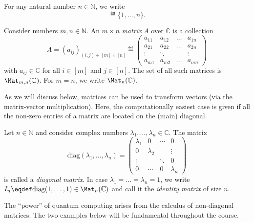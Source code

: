 \documentclass[a4paper,oneside, 12pt]{amsart}
\begin{document}
For any natural number  \(n \in \mathbb{N}\), we write
\begin{equation}
  [n] \eqdef \{1, \dots , n\}.
\end{equation}
\begin{definition}\label{def:matrices}
  Consider numbers \(m, n \in \mathbb{N}\).
  An \( m \times n \) \emph{matrix} \(A\) over \( \mathbb{C} \) is a collection
  \begin{equation}
    A= (a_{ij})_{(i, j) \in [m] \times [n]} \eqdef
    \begin{pmatrix}
      a_{11} & a_{12} & \dots & a_{1n} \\
      a_{21} & a_{22} & \dots & a_{2n} \\
      \vdots& \ddots & & \vdots\\
      a_{m1} & a_{m2} & \dots & a_{mn}
    \end{pmatrix}
  \end{equation}
  with \(a_{ij} \in \mathbb{C}\) for all \(i \in [m]\) and \(j \in [n]\).
  The set of all such matrices is \( \Mat_{m,n}(\mathbb{C}) \).
  For \( m = n \), we write \( \Mat_n(\mathbb{C}) \).
\end{definition}

As we will discuss below, matrices can be used to transform vectors (via the matrix-vector multiplication).
Here, the computationally easiest case is given if all the non-zero entries of a matrix are located on the (main) diagonal.
\begin{example}\label{ex:diagonal-matrices}
  Let \(n\in \mathbb{N}\) and consider complex numbers \(\lambda_{1}, \dots , \lambda_{n} \in \mathbb{C}\).
  The matrix
  \begin{equation}
    \mathrm{diag}(\lambda_{1}, \dots , \lambda_{n}) =
    \begin{pmatrix}
      \lambda_1 & 0 & \cdots & 0 \\
      0 & \lambda_2 & & \vdots \\
      \vdots & & \ddots & 0 \\
      0 & \cdots & 0 & \lambda_n
    \end{pmatrix}
  \end{equation}
  is called a \emph{diagonal matrix}.
  In case \(\lambda_{1}= \dots = \lambda_{n} = 1\), we write \(I_{n}\eqdef \mathrm{diag}(1, \dots ,1)\in \Mat_{n}(\mathbb{C})\) and call it the \emph{identity matrix} of size \(n\).
\end{example}

The ``power'' of quantum computing arises from the calculus of non-diagonal matrices.
The two examples below will be fundamental throughout the course.
\end{document}
